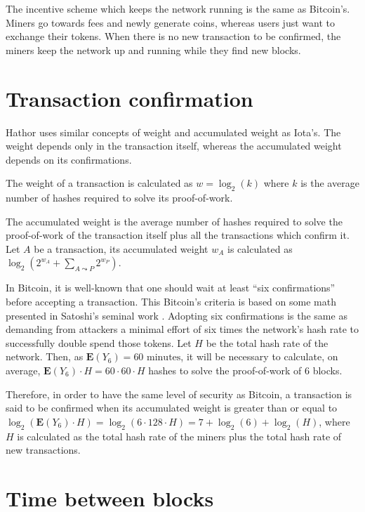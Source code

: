 The incentive scheme which keeps the network running is the same as Bitcoin's. Miners go towards fees and newly generate coins, whereas users just want to exchange their tokens. When there is no new transaction to be confirmed, the miners keep the network up and running while they find new blocks.


\section{Transaction confirmation}

Hathor uses similar concepts of weight and accumulated weight as Iota's. The weight depends only in the transaction itself, whereas the accumulated weight depends on its confirmations.

The weight of a transaction is calculated as $w = \log_2(k)$ where $k$ is the average number of hashes required to solve its proof-of-work.

The accumulated weight is the average number of hashes required to solve the proof-of-work of the transaction itself plus all the transactions which confirm it. Let $A$ be a transaction, its accumulated weight $w_A$ is calculated as $\log_2(2^{w_A} + \sum_{A \leadsto P} 2^{w_P})$.

In Bitcoin, it is well-known that one should wait at least ``six confirmations'' before accepting a transaction. This Bitcoin's criteria is based on some math presented in Satoshi's seminal work \citep{nakamoto2008bitcoin}. Adopting six confirmations is the same as demanding from attackers a minimal effort of six times the network's hash rate to successfully double spend those tokens. Let $H$ be the total hash rate of the network. Then, as $\mathbf{E}(Y_6) = 60 \text{ minutes}$, it will be necessary to calculate, on average, $\mathbf{E}(Y_6) \cdot H = 60 \cdot 60 \cdot H$ hashes to solve the proof-of-work of 6 blocks.

Therefore, in order to have the same level of security as Bitcoin, a transaction is said to be confirmed when its accumulated weight is greater than or equal to $\log_2(\mathbf{E}(Y_6) \cdot H) = \log_2(6 \cdot 128 \cdot H) = 7 + \log_2(6) + \log_2(H)$, where $H$ is calculated as the total hash rate of the miners plus the total hash rate of new transactions.


\section{Time between blocks}

